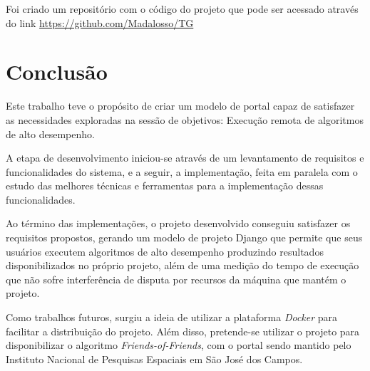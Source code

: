 \documentclass[tg]{mdtufsm}
\begin{document}
Foi criado um repositório com o código do projeto que pode ser acessado através do link \url{https://github.com/Madalosso/TG}


\chapter{Conclusão}
Este trabalho teve o propósito de criar um modelo de portal capaz de satisfazer as necessidades exploradas na sessão de objetivos: Execução remota de algoritmos de alto desempenho.

A etapa de desenvolvimento iniciou-se através de um levantamento de requisitos e funcionalidades do sistema, e a seguir, a implementação, feita em paralela com o estudo das melhores técnicas e ferramentas para a implementação dessas funcionalidades. 

Ao término das implementações, o projeto desenvolvido conseguiu satisfazer os requisitos propostos, gerando um modelo de projeto Django que permite que seus usuários executem algoritmos de alto desempenho produzindo resultados disponibilizados no próprio projeto, além de uma medição do tempo de execução que não sofre interferência de disputa por recursos da máquina que mantém o projeto.

Como trabalhos futuros, surgiu a ideia de utilizar a plataforma \emph{Docker} para facilitar a distribuição do projeto. Além disso, pretende-se utilizar o projeto para disponibilizar o algoritmo \emph{Friends-of-Friends}, com o portal sendo mantido pelo Instituto Nacional de Pesquisas Espaciais em São José dos Campos.


\setlength{\baselineskip}{\baselineskip}


\end{document}
